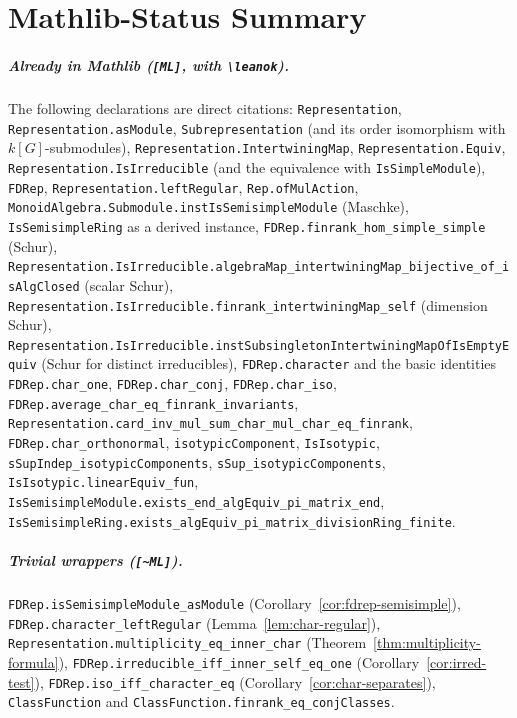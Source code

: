 \chapter{Mathlib-Status Summary}
\label{chap:status}

\paragraph{Already in Mathlib (\texttt{[ML]}, with \texttt{\textbackslash leanok}).}
The following declarations are direct citations:
\texttt{Representation}, \texttt{Representation.asModule},
\texttt{Subrepresentation} (and its order isomorphism with $k[G]$-submodules),
\texttt{Representation.IntertwiningMap}, \texttt{Representation.Equiv},
\texttt{Representation.IsIrreducible} (and the equivalence with
\texttt{IsSimpleModule}), \texttt{FDRep},
\texttt{Representation.leftRegular}, \texttt{Rep.ofMulAction},
\texttt{MonoidAlgebra.Submodule.instIsSemisimpleModule} (Maschke),
\texttt{IsSemisimpleRing} as a derived instance,
\texttt{FDRep.finrank\_hom\_simple\_simple} (Schur),
\texttt{Representation.IsIrreducible.algebraMap\_intertwiningMap\_bijective\_of\_isAlgClosed}
(scalar Schur),
\texttt{Representation.IsIrreducible.finrank\_intertwiningMap\_self}
(dimension Schur),
\texttt{Representation.IsIrreducible.instSubsingletonIntertwiningMapOfIsEmptyEquiv}
(Schur for distinct irreducibles),
\texttt{FDRep.character} and the basic identities
\texttt{FDRep.char\_one}, \texttt{FDRep.char\_conj}, \texttt{FDRep.char\_iso},
\texttt{FDRep.average\_char\_eq\_finrank\_invariants},
\texttt{Representation.card\_inv\_mul\_sum\_char\_mul\_char\_eq\_finrank},
\texttt{FDRep.char\_orthonormal},
\texttt{isotypicComponent}, \texttt{IsIsotypic},
\texttt{sSupIndep\_isotypicComponents}, \texttt{sSup\_isotypicComponents},
\texttt{IsIsotypic.linearEquiv\_fun},
\texttt{IsSemisimpleModule.exists\_end\_algEquiv\_pi\_matrix\_end},
\texttt{IsSemisimpleRing.exists\_algEquiv\_pi\_matrix\_divisionRing\_finite}.

\paragraph{Trivial wrappers (\texttt{[\textasciitilde ML]}).}
\texttt{FDRep.isSemisimpleModule\_asModule} (Corollary~\ref{cor:fdrep-semisimple}),
\texttt{FDRep.character\_leftRegular} (Lemma~\ref{lem:char-regular}),
\texttt{Representation.multiplicity\_eq\_inner\_char}
(Theorem~\ref{thm:multiplicity-formula}),
\texttt{FDRep.irreducible\_iff\_inner\_self\_eq\_one}
(Corollary~\ref{cor:irred-test}),
\texttt{FDRep.iso\_iff\_character\_eq} (Corollary~\ref{cor:char-separates}),
\texttt{ClassFunction} and \texttt{ClassFunction.finrank\_eq\_conjClasses}.

